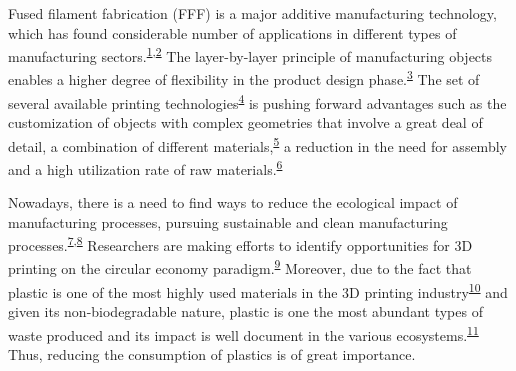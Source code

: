 \documentclass[
  12pt]{article}
\begin{document}
Fused filament fabrication (FFF) is a major additive manufacturing technology, which has found considerable number of applications in different types of manufacturing sectors.\textsuperscript{\protect\hyperlink{ref-Singh2020d}{1},\protect\hyperlink{ref-Sartal2018}{2}}
The layer-by-layer principle of manufacturing objects enables a higher degree of flexibility in the product design phase.\textsuperscript{\protect\hyperlink{ref-Akhoundi2019}{3}}
The set of several available printing technologies\textsuperscript{\protect\hyperlink{ref-Nam2019}{4}} is pushing forward advantages such as the customization of objects with complex geometries that involve a great deal of detail, a combination of different materials,\textsuperscript{\protect\hyperlink{ref-Askari2020}{5}} a reduction in the need for assembly and a high utilization rate of raw materials.\textsuperscript{\protect\hyperlink{ref-Wang2020f}{6}}

Nowadays, there is a need to find ways to reduce the ecological impact of manufacturing processes, pursuing sustainable and clean manufacturing processes.\textsuperscript{\protect\hyperlink{ref-Niaki2019}{7},\protect\hyperlink{ref-Peng2018}{8}}
Researchers are making efforts to identify opportunities for 3D printing on the circular economy paradigm.\textsuperscript{\protect\hyperlink{ref-Despeisse2016}{9}}
Moreover, due to the fact that plastic is one of the most highly used materials in the 3D printing industry\textsuperscript{\protect\hyperlink{ref-GonzalezHenriquez2019}{10}} and given its non-biodegradable nature, plastic is one the most abundant types of waste produced and its impact is well document in the various ecosystems.\textsuperscript{\protect\hyperlink{ref-Ryberg2019}{11}}
Thus, reducing the consumption of plastics is of great importance.
\end{document}
